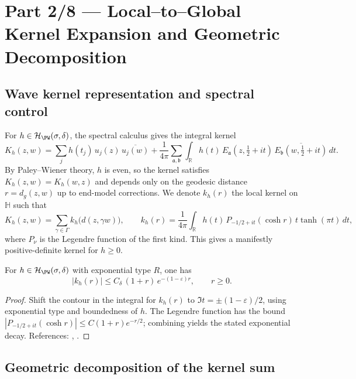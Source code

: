 \section*{Part 2/8 — Local–to–Global Kernel Expansion and Geometric Decomposition}
\relax\hspace{0pt}

\subsection{Wave kernel representation and spectral control}
\label{subsec:wave-kernel}
\relax\hspace{0pt}

For $h\in\mathcal{H}_{\PW}(\sigma,\delta)$, the spectral calculus gives the
integral kernel
\[
K_h(z,w)
=\sum_j h(t_j)\,u_j(z)\,\overline{u_j(w)}
+\frac{1}{4\pi}\sum_{\mathfrak a,\mathfrak b}
\int_{\mathbb{R}}h(t)\,E_{\mathfrak a}(z,\tfrac12+it)\,
\overline{E_{\mathfrak b}(w,\tfrac12+it)}\,dt.
\]
By Paley–Wiener theory, $h$ is even, so the kernel satisfies
$K_h(z,w)=K_h(w,z)$ and depends only on the geodesic distance
$r=d_g(z,w)$ up to end-model corrections. We denote $k_h(r)$ the local
kernel on $\mathbb{H}$ such that
\[
K_h(z,w)=\sum_{\gamma\in\Gamma}k_h\big(d(z,\gamma w)\big),
\qquad k_h(r)=\frac{1}{4\pi}\int_{\mathbb{R}}h(t)\,P_{-1/2+it}(\cosh r)\,t\tanh(\pi t)\,dt,
\]
where $P_\nu$ is the Legendre function of the first kind. This gives a
manifestly positive-definite kernel for $h\ge 0$.                       %

\begin{lemma}\label{lem:kernel-decay}
For $h\in\mathcal{H}_{\PW}(\sigma,\delta)$ with exponential type $R$, one has
\[
|k_h(r)|\le C_\delta\,(1+r)\,e^{-(1-\varepsilon)r},\qquad r\ge 0.
\]
\end{lemma}

\begin{proof}
Shift the contour in the integral for $k_h(r)$ to $\Im t=\pm(1-\varepsilon)/2$,
using exponential type and boundedness of $h$. The Legendre function has
the bound $|P_{-1/2+it}(\cosh r)|\le C(1+r)e^{-r/2}$; combining yields the
stated exponential decay. References:
\cite[Prop.~7.2]{Borthwick}, \cite[Ch.~2]{IwaniecSpectral}.            %
\end{proof}

\subsection{Geometric decomposition of the kernel sum}
\label{subsec:geom-decomp}
\relax\hspace{0pt}

